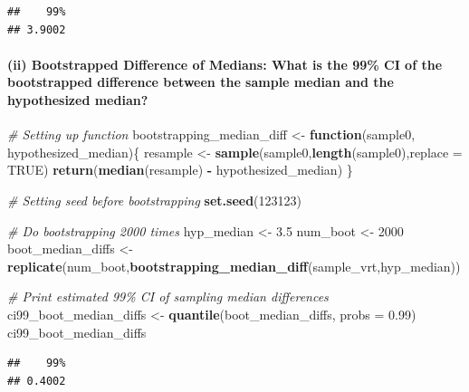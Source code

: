 \documentclass[
]{article}
\newenvironment{Shaded}{\begin{snugshade}}{\end{snugshade}}
\newcommand{\AttributeTok}[1]{\textcolor[rgb]{0.13,0.29,0.53}{#1}}
\newcommand{\CommentTok}[1]{\textcolor[rgb]{0.56,0.35,0.01}{\textit{#1}}}
\newcommand{\ConstantTok}[1]{\textcolor[rgb]{0.56,0.35,0.01}{#1}}
\newcommand{\ControlFlowTok}[1]{\textcolor[rgb]{0.13,0.29,0.53}{\textbf{#1}}}
\newcommand{\DecValTok}[1]{\textcolor[rgb]{0.00,0.00,0.81}{#1}}
\newcommand{\FloatTok}[1]{\textcolor[rgb]{0.00,0.00,0.81}{#1}}
\newcommand{\FunctionTok}[1]{\textcolor[rgb]{0.13,0.29,0.53}{\textbf{#1}}}
\newcommand{\NormalTok}[1]{#1}
\newcommand{\OtherTok}[1]{\textcolor[rgb]{0.56,0.35,0.01}{#1}}
\newcommand{\SpecialCharTok}[1]{\textcolor[rgb]{0.81,0.36,0.00}{\textbf{#1}}}
\begin{document}
\begin{verbatim}
##    99% 
## 3.9002
\end{verbatim}

\hypertarget{ii-bootstrapped-difference-of-medians-what-is-the-99-ci-of-the-bootstrapped-difference-between-the-sample-median-and-the-hypothesized-median}{%
\paragraph{(ii) Bootstrapped Difference of Medians: What is the 99\% CI
of the bootstrapped difference between the sample median and the
hypothesized
median?}\label{ii-bootstrapped-difference-of-medians-what-is-the-99-ci-of-the-bootstrapped-difference-between-the-sample-median-and-the-hypothesized-median}}

\begin{Shaded}
\begin{Highlighting}[]
\CommentTok{\# Setting up function}
\NormalTok{bootstrapping\_median\_diff }\OtherTok{\textless{}{-}} \ControlFlowTok{function}\NormalTok{(sample0, hypothesized\_median)\{}
\NormalTok{  resample }\OtherTok{\textless{}{-}} \FunctionTok{sample}\NormalTok{(sample0,}\FunctionTok{length}\NormalTok{(sample0),}\AttributeTok{replace =} \ConstantTok{TRUE}\NormalTok{)}
  \FunctionTok{return}\NormalTok{(}\FunctionTok{median}\NormalTok{(resample) }\SpecialCharTok{{-}}\NormalTok{ hypothesized\_median)}
\NormalTok{\}}

\CommentTok{\# Setting seed before bootstrapping}
\FunctionTok{set.seed}\NormalTok{(}\DecValTok{123123}\NormalTok{)}

\CommentTok{\# Do bootstrapping 2000 times}
\NormalTok{hyp\_median }\OtherTok{\textless{}{-}} \FloatTok{3.5}
\NormalTok{num\_boot }\OtherTok{\textless{}{-}} \DecValTok{2000}
\NormalTok{boot\_median\_diffs }\OtherTok{\textless{}{-}} \FunctionTok{replicate}\NormalTok{(num\_boot,}\FunctionTok{bootstrapping\_median\_diff}\NormalTok{(sample\_vrt,hyp\_median))}

\CommentTok{\# Print estimated 99\% CI of sampling median differences}
\NormalTok{ci99\_boot\_median\_diffs }\OtherTok{\textless{}{-}} \FunctionTok{quantile}\NormalTok{(boot\_median\_diffs, }\AttributeTok{probs =} \FloatTok{0.99}\NormalTok{)}
\NormalTok{ci99\_boot\_median\_diffs}
\end{Highlighting}
\end{Shaded}

\begin{verbatim}
##    99% 
## 0.4002
\end{verbatim}
\end{document}
